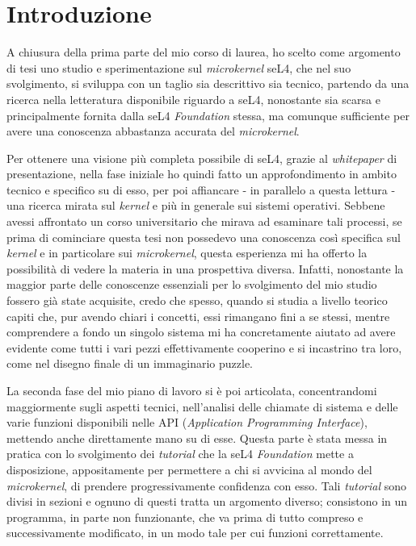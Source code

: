 \chapter{Introduzione}
A chiusura della prima parte del mio corso di laurea, ho scelto come argomento di tesi uno studio e sperimentazione sul \textit{microkernel} seL4, che nel suo svolgimento, si sviluppa con un taglio sia descrittivo sia tecnico, partendo da una ricerca nella letteratura disponibile riguardo a seL4, nonostante sia scarsa e principalmente fornita dalla seL4 \textit{Foundation} stessa, ma comunque sufficiente per avere una conoscenza abbastanza accurata del \textit{microkernel}.

Per ottenere una visione più completa possibile di seL4, grazie al \textit{whitepaper} \cite{sel4-whitepaper} di presentazione, nella fase iniziale ho quindi fatto un approfondimento in ambito tecnico e specifico su di esso, per poi affiancare - in parallelo a questa lettura - una ricerca mirata sul \textit{kernel} e più in generale sui sistemi operativi. Sebbene avessi affrontato un corso universitario che mirava ad esaminare tali processi, se prima di cominciare questa tesi non possedevo una conoscenza così specifica sul \textit{kernel} e in particolare sui \textit{microkernel}, questa esperienza mi ha offerto la possibilità di vedere la materia in una prospettiva diversa. Infatti, nonostante la maggior parte delle conoscenze essenziali per lo svolgimento del mio studio fossero già state acquisite, credo che spesso, quando si studia a livello teorico capiti che, pur avendo chiari i concetti, essi rimangano fini a se stessi, mentre comprendere a fondo un singolo sistema mi ha concretamente aiutato ad avere evidente come tutti i vari pezzi effettivamente cooperino e si incastrino tra loro, come nel disegno finale di un immaginario puzzle.

La seconda fase del mio piano di lavoro si è poi articolata, concentrandomi maggiormente sugli aspetti tecnici, nell'analisi delle chiamate di sistema e delle varie funzioni disponibili nelle API (\textit{Application Programming Interface}), mettendo anche direttamente mano su di esse. Questa parte è stata messa in pratica con lo svolgimento dei \textit{tutorial} che la seL4 \textit{Foundation} mette a disposizione, appositamente per permettere a chi si avvicina al mondo del \textit{microkernel}, di prendere progressivamente confidenza con esso. Tali \textit{tutorial} sono divisi in sezioni e ognuno di questi tratta un argomento diverso; consistono in un programma, in parte non funzionante, che va prima di tutto compreso e successivamente modificato, in un modo tale per cui funzioni correttamente.

